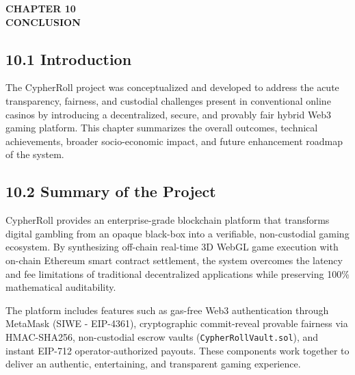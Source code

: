\vspace*{0.5cm}
\begin{center}
\textbf{CHAPTER 10}\\[0.15cm]
\textbf{CONCLUSION}
\end{center}
\label{chap:conclusion}
\vspace{0.2cm}

\subsection*{10.1 Introduction}
The CypherRoll project was conceptualized and developed to address the acute transparency, fairness, and custodial challenges present in conventional online casinos by introducing a decentralized, secure, and provably fair hybrid Web3 gaming platform. This chapter summarizes the overall outcomes, technical achievements, broader socio-economic impact, and future enhancement roadmap of the system.

\subsection*{10.2 Summary of the Project}
CypherRoll provides an enterprise-grade blockchain platform that transforms digital gambling from an opaque black-box into a verifiable, non-custodial gaming ecosystem. By synthesizing off-chain real-time 3D WebGL game execution with on-chain Ethereum smart contract settlement, the system overcomes the latency and fee limitations of traditional decentralized applications while preserving 100\% mathematical auditability.

The platform includes features such as gas-free Web3 authentication through MetaMask (SIWE - EIP-4361), cryptographic commit-reveal provable fairness via HMAC-SHA256, non-custodial escrow vaults (\texttt{CypherRollVault.sol}), and instant EIP-712 operator-authorized payouts. These components work together to deliver an authentic, entertaining, and transparent gaming experience.

